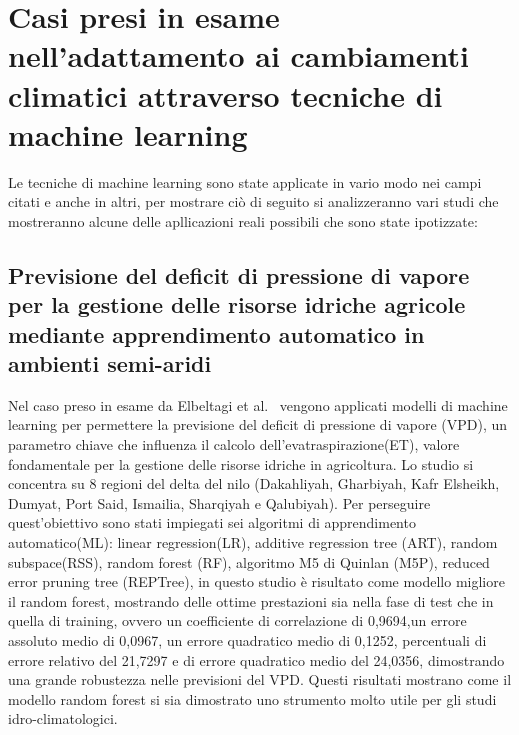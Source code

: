 \section{Casi presi in esame nell'adattamento ai cambiamenti climatici attraverso tecniche di machine learning}

Le tecniche di machine learning sono state applicate in vario modo nei campi citati e anche in altri, per mostrare ciò di seguito si analizzeranno vari studi che mostreranno alcune delle apllicazioni reali possibili che sono state ipotizzate:

\subsection{Previsione del deficit di pressione di vapore per la gestione delle risorse idriche agricole mediante apprendimento automatico in ambienti semi-aridi}
Nel caso preso in esame da Elbeltagi et al.~\cite{elbeltagi2023vpd} vengono applicati modelli di machine learning per permettere la previsione del deficit di pressione di vapore (VPD), un parametro chiave che influenza il calcolo dell’evatraspirazione(ET), valore fondamentale per la gestione delle risorse idriche in agricoltura.
Lo studio si concentra su 8 regioni del delta del nilo (Dakahliyah, Gharbiyah, Kafr Elsheikh, Dumyat, Port Said, Ismailia, Sharqiyah e Qalubiyah).
Per perseguire quest'obiettivo sono stati impiegati sei algoritmi di apprendimento automatico(ML): linear regression(LR), additive regression tree (ART), random subspace(RSS), random forest (RF), algoritmo M5 di Quinlan (M5P), reduced error pruning tree (REPTree), in questo studio è risultato come modello migliore il random forest, mostrando delle ottime prestazioni sia nella fase di test che in quella di training, ovvero un coefficiente di correlazione di 0,9694,un errore assoluto medio di 0,0967, un errore quadratico medio di 0,1252, percentuali di errore relativo del 21,7297 e di errore quadratico medio del 24,0356, dimostrando una grande robustezza nelle previsioni del VPD. Questi risultati mostrano come il modello random forest si sia dimostrato uno strumento molto utile per gli studi idro-climatologici.

